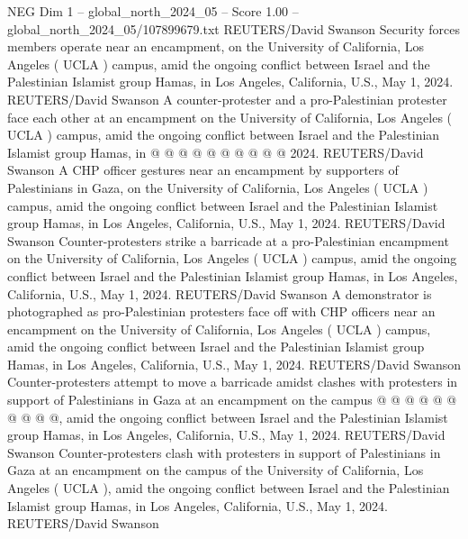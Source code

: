 \begin{textsample}{NEG Dim 1 – global\_north\_2024\_05 – Score 1.00 – global\_north\_2024\_05/107899679.txt}
REUTERS/David Swanson Security forces members operate near an encampment, on the University of California, Los Angeles ( UCLA ) campus, amid the ongoing conflict between Israel and the Palestinian Islamist group Hamas, in Los Angeles, California, U.S., May 1, 2024.
REUTERS/David Swanson A counter-protester and a pro-Palestinian protester face each other at an encampment on the University of California, Los Angeles ( UCLA ) campus, amid the ongoing conflict between Israel and the Palestinian Islamist group Hamas, in @ @ @ @ @ @ @ @ @ @ 2024.
REUTERS/David Swanson A CHP officer gestures near an encampment by supporters of Palestinians in Gaza, on the University of California, Los Angeles ( UCLA ) campus, amid the ongoing conflict between Israel and the Palestinian Islamist group Hamas, in Los Angeles, California, U.S., May 1, 2024.
REUTERS/David Swanson Counter-protesters strike a barricade at a pro-Palestinian encampment on the University of California, Los Angeles ( UCLA ) campus, amid the ongoing conflict between Israel and the Palestinian Islamist group Hamas, in Los Angeles, California, U.S., May 1, 2024.
REUTERS/David Swanson A demonstrator is photographed as pro-Palestinian protesters face off with CHP officers near an encampment on the University of California, Los Angeles ( UCLA ) campus, amid the ongoing conflict between Israel and the Palestinian Islamist group Hamas, in Los Angeles, California, U.S., May 1, 2024.
REUTERS/David Swanson Counter-protesters attempt to move a barricade amidst clashes with protesters in support of Palestinians in Gaza at an encampment on the campus @ @ @ @ @ @ @ @ @ @, amid the ongoing conflict between Israel and the Palestinian Islamist group Hamas, in Los Angeles, California, U.S., May 1, 2024.
REUTERS/David Swanson Counter-protesters clash with protesters in support of Palestinians in Gaza at an encampment on the campus of the University of California, Los Angeles ( UCLA ), amid the ongoing conflict between Israel and the Palestinian Islamist group Hamas, in Los Angeles, California, U.S., May 1, 2024.
REUTERS/David Swanson

\end{textsample}
